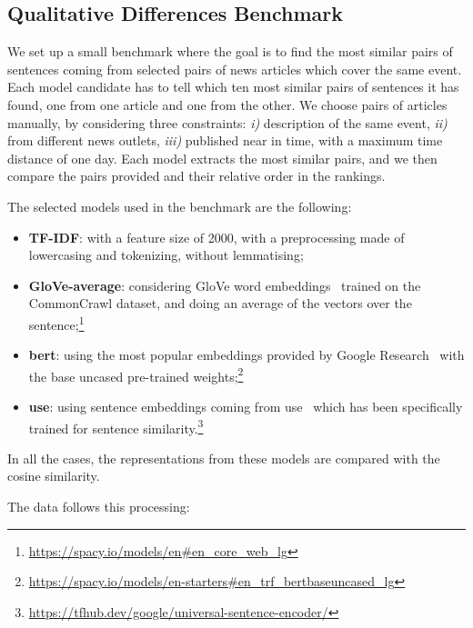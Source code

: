 \subsection{\statusgreen Qualitative Differences Benchmark}
\label{ssec:cgs_similarity_qualitative}
We set up a small benchmark where the goal is to find the most similar pairs of sentences coming from selected pairs of news articles which cover the same event. Each model candidate has to tell which ten most similar pairs of sentences it has found, one from one article and one from the other.
We choose pairs of articles manually, %
by considering three constraints: \textit{i)} description of the same event, \textit{ii)} from different news outlets, \textit{iii)} published near in time, with a maximum time distance of one day.
Each model extracts the most similar pairs, and we then compare the pairs provided and their relative order in the rankings.

The selected models used in the benchmark are the following:
\begin{itemize}
    \item \textbf{TF-IDF}: with a feature size of 2000, with a preprocessing made of lowercasing and tokenizing, without lemmatising;
    \item \textbf{GloVe-average}: considering GloVe word embeddings~\citep{pennington2014glove} trained on the CommonCrawl dataset, and doing an average of the vectors over the sentence;\footnote{\url{https://spacy.io/models/en\#en_core_web_lg}}
    \item \textbf{\acrshort{bert}}: using the most popular embeddings provided by Google Research~\citep{devlin2018bert} with the base uncased pre-trained weights;\footnote{\url{https://spacy.io/models/en-starters\#en_trf_bertbaseuncased_lg}}
    \item \textbf{\acrshort{use}}: using sentence embeddings coming from \acrfull{use}~\citep{cer2018universal} which has been specifically trained for sentence similarity.\footnote{\url{https://tfhub.dev/google/universal-sentence-encoder/}}
\end{itemize}

In all the cases, the representations from these models are compared with the cosine similarity.

The data follows this processing:

